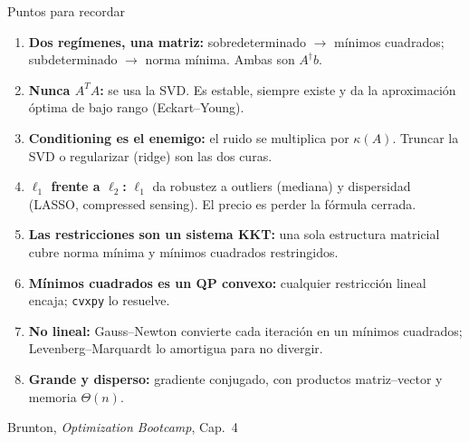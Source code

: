 \documentclass[10pt,aspectratio=169]{beamer}
\newcommand{\fuente}{\vfill{\scriptsize\color{gray}Brunton, \emph{Optimization Bootcamp}, Cap.~4}}
\begin{document}
\begin{frame}{Puntos para recordar}
  \small
  \begin{enumerate}
    \item \textbf{Dos regímenes, una matriz:} sobredeterminado $\to$ mínimos
      cuadrados; subdeterminado $\to$ norma mínima. Ambas son $A^{\dagger}b$.
    \item \textbf{Nunca $A^TA$:} se usa la SVD. Es estable, siempre existe y da
      la aproximación óptima de bajo rango (Eckart--Young).
    \item \textbf{Conditioning es el enemigo:} el ruido se multiplica por
      $\kappa(A)$. Truncar la SVD o regularizar (ridge) son las dos curas.
    \item \textbf{$\ell_1$ frente a $\ell_2$:} $\ell_1$ da robustez a outliers
      (mediana) y dispersidad (LASSO, compressed sensing). El precio es perder
      la fórmula cerrada.
    \item \textbf{Las restricciones son un sistema KKT:} una sola estructura
      matricial cubre norma mínima y mínimos cuadrados restringidos.
    \item \textbf{Mínimos cuadrados es un QP convexo:} cualquier restricción
      lineal encaja; \texttt{cvxpy} lo resuelve.
    \item \textbf{No lineal:} Gauss--Newton convierte cada iteración en un
      mínimos cuadrados; Levenberg--Marquardt lo amortigua para no divergir.
    \item \textbf{Grande y disperso:} gradiente conjugado, con productos
      matriz--vector y memoria $\Theta(n)$.
  \end{enumerate}
  \fuente
\end{frame}
\end{document}
